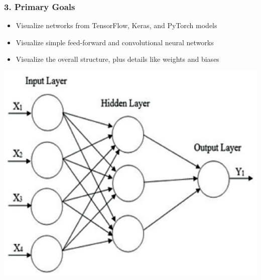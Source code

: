 \documentclass{beamer}
\begin{document}
\begin{frame}
    \frametitle{3. Primary Goals} 
    \begin{itemize}
        \item Visualize networks from TensorFlow, Keras, and PyTorch models
        \item Visualize simple feed-forward and convolutional neural networks
        \item Visualize the overall structure, plus details like weights and biases 
    \end{itemize}
    \centering
    \includegraphics{simple_NN.jpg}
\end{frame}
\end{document}
